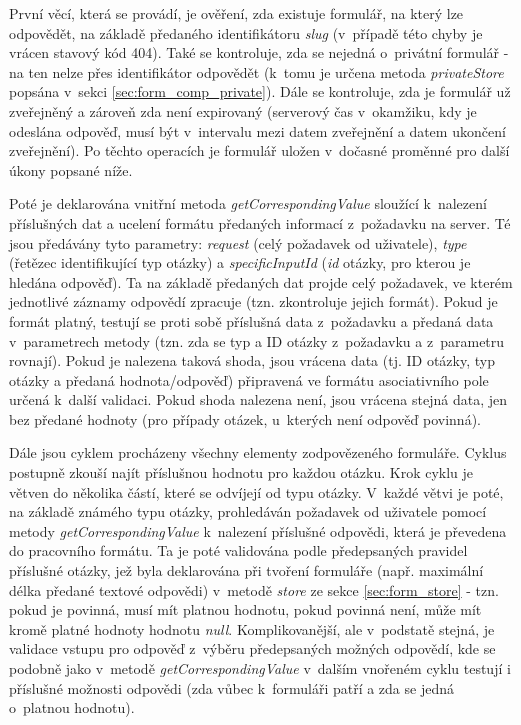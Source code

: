			První věcí, která se provádí, je ověření, zda existuje formulář, na který lze odpovědět, na základě předaného identifikátoru \textit{slug} (v~případě této chyby je vrácen stavový kód 404). Také se kontroluje, zda se nejedná o~privátní formulář - na ten nelze přes identifikátor odpovědět (k~tomu je určena metoda \textit{privateStore} popsána v~sekci \ref{sec:form_comp_private}). Dále se kontroluje, zda je formulář už zveřejněný a zároveň zda není expirovaný (serverový čas v~okamžiku, kdy je odeslána odpověď, musí být v~intervalu mezi datem zveřejnění a datem ukončení zveřejnění). Po těchto operacích je formulář uložen v~dočasné proměnné pro další úkony popsané níže.
			
			Poté je deklarována vnitřní metoda \textit{getCorrespondingValue} sloužící k~nalezení příslušných dat a ucelení formátu předaných informací z~požadavku na server. Té jsou předávány tyto parametry: \textit{request} (celý požadavek od uživatele), \textit{type} (řetězec identifikující typ otázky) a \textit{specificInputId} (\textit{id} otázky, pro kterou je hledána odpověď). Ta na základě předaných dat projde celý požadavek, ve kterém jednotlivé záznamy odpovědí zpracuje (tzn. zkontroluje jejich formát). Pokud je formát platný, testují se proti sobě příslušná data z~požadavku a předaná data v~parametrech metody (tzn. zda se typ a ID otázky z~požadavku a z~parametru rovnají). Pokud je nalezena taková shoda, jsou vrácena data (tj. ID otázky, typ otázky a předaná hodnota/odpověď) připravená ve formátu asociativního pole určená k~další validaci. Pokud shoda nalezena není, jsou vrácena stejná data, jen bez předané hodnoty (pro případy otázek, u~kterých není odpověď povinná).
			
			Dále jsou cyklem procházeny všechny elementy zodpovězeného formuláře. Cyklus postupně zkouší najít příslušnou hodnotu pro každou otázku. Krok cyklu je větven do několika částí, které se odvíjejí od typu otázky. V~každé větvi je poté, na základě známého typu otázky, prohledáván požadavek od uživatele pomocí metody \textit{getCorrespondingValue} k~nalezení příslušné odpovědi, která je převedena do pracovního formátu. Ta je poté validována podle předepsaných pravidel příslušné otázky, jež byla deklarována při tvoření formuláře (např. maximální délka předané textové odpovědi) v~metodě \textit{store} ze sekce \ref{sec:form_store} - tzn. pokud je povinná, musí mít platnou hodnotu, pokud povinná není, může mít kromě platné hodnoty hodnotu \textit{null}. Komplikovanější, ale v~podstatě stejná, je validace vstupu pro odpověď z~výběru předepsaných možných odpovědí, kde se podobně jako v~metodě \textit{getCorrespondingValue} v~dalším vnořeném cyklu testují i příslušné možnosti odpovědi (zda vůbec k~formuláři patří a zda se jedná o~platnou hodnotu).
			
